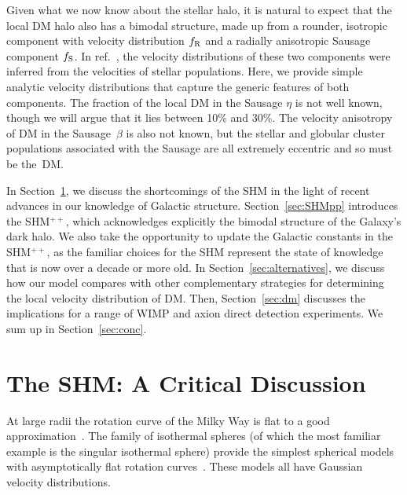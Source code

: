 \documentclass[prd,10pt,twocolumn,showpacs,nofootinbib, aps,superscriptaddress,preprintnumbers]{revtex4-1}
\newcommand{\fR}{f_{\rm R}}
\newcommand{\fS}{f_{\rm S}}
\begin{document}
Given what we now know about the stellar halo, it is natural to expect
that the local DM halo also has a bimodal structure, made up from a
rounder, isotropic component with velocity distribution $\fR$ and a
radially anisotropic Sausage component $\fS$.  In
ref.~\citep{Necib:2018iwb}, the velocity distributions of these two
components were inferred from the velocities of stellar populations.
Here, we provide simple analytic velocity distributions that capture
the generic features of both components. The fraction of the local DM
in the Sausage $\eta$ is not well known, though we will argue that it
lies between 10\% and 30\%.  The velocity anisotropy of DM in the
Sausage~$\beta$ is also not known, but the stellar and globular
cluster populations associated with the Sausage are all extremely
eccentric and so must be the~DM.

In Section~\ref{sec:SHM}, we discuss the shortcomings of the SHM in
the light of recent advances in our knowledge of Galactic
structure. Section~\ref{sec:SHMpp} introduces the SHM$^{++}$, which
acknowledges explicitly the bimodal structure of the Galaxy's dark
halo.  We also take the opportunity to update the Galactic constants
in the SHM$^{++}$, as the familiar choices for the SHM represent the
state of knowledge that is now over a decade or more old. In
Section~\ref{sec:alternatives}, we discuss how our model compares with
other complementary strategies for determining the local velocity
distribution of DM. Then, Section~\ref{sec:dm} discusses the
implications for a range of WIMP and axion direct detection
experiments. We sum up in Section~\ref{sec:conc}.


\section{The SHM: A Critical Discussion}\label{sec:SHM}
At large radii the rotation curve of the Milky Way is flat to a good approximation~\citep{So09}. The family of isothermal spheres (of which
the most familiar example is the singular isothermal sphere) provide
the simplest spherical models with asymptotically flat rotation
curves~\cite{BT}. These models all have Gaussian
velocity distributions.
\end{document}
